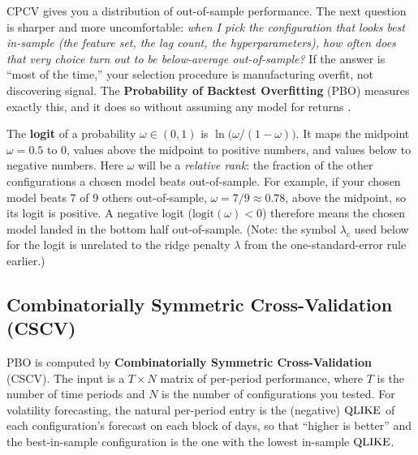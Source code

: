 CPCV gives you a distribution of out-of-sample performance.
The next question is sharper and more uncomfortable: \emph{when I pick the configuration that looks best in-sample (the feature set, the lag count, the hyperparameters), how often does that very choice turn out to be below-average out-of-sample?}
If the answer is ``most of the time,'' your selection procedure is manufacturing overfit, not discovering signal.
The \textbf{Probability of Backtest Overfitting} (PBO) measures exactly this, and it does so without assuming any model for returns \citep{Bailey2014PBO}.

\begin{prereq}
The \textbf{logit} of a probability $\omega \in (0,1)$ is $\ln\!\bigl(\omega/(1-\omega)\bigr)$.
It maps the midpoint $\omega = 0.5$ to $0$, values above the midpoint to positive numbers, and values below to negative numbers.
Here $\omega$ will be a \emph{relative rank}: the fraction of the other configurations a chosen model beats out-of-sample. For example, if your chosen model beats 7 of 9 others out-of-sample, $\omega = 7/9 \approx 0.78$, above the midpoint, so its logit is positive.
A negative logit ($\text{logit}(\omega) < 0$) therefore means the chosen model landed in the bottom half out-of-sample.
(Note: the symbol $\lambda_c$ used below for the logit is unrelated to the ridge penalty $\lambda$ from the one-standard-error rule earlier.)
\end{prereq}

\subsection{Combinatorially Symmetric Cross-Validation (CSCV)}

PBO is computed by \textbf{Combinatorially Symmetric Cross-Validation} (CSCV).
The input is a $T \times N$ matrix of per-period performance, where $T$ is the number of time periods and $N$ is the number of configurations you tested.
For volatility forecasting, the natural per-period entry is the (negative) $\operatorname{QLIKE}$ of each configuration's forecast on each block of days, so that ``higher is better'' and the best-in-sample configuration is the one with the lowest in-sample $\operatorname{QLIKE}$.

